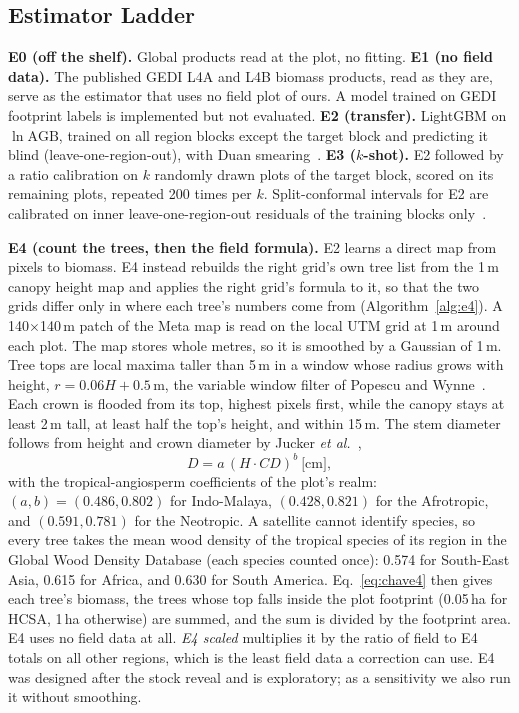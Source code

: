 \documentclass[conference,a4paper]{IEEEtran}
\begin{document}
\subsection{Estimator Ladder}
\textbf{E0 (off the shelf).} Global products read at the plot, no fitting. \textbf{E1 (no field data).} The published GEDI L4A and L4B biomass products, read as they are, serve as the estimator that uses no field plot of ours. A model trained on GEDI footprint labels is implemented but not evaluated. \textbf{E2 (transfer).} LightGBM on $\ln\mathrm{AGB}$, trained on all region blocks except the target block and predicting it blind (leave-one-region-out), with Duan smearing~\cite{duan1983smearing}. \textbf{E3 ($k$-shot).} E2 followed by a ratio calibration on $k$ randomly drawn plots of the target block, scored on its remaining plots, repeated 200 times per $k$. Split-conformal intervals for E2 are calibrated on inner leave-one-region-out residuals of the training blocks only~\cite{vovk2005algorithmic}.

\textbf{E4 (count the trees, then the field formula).} E2 learns a direct map from pixels to biomass. E4 instead rebuilds the right grid's own tree list from the 1\,m canopy height map and applies the right grid's formula to it, so that the two grids differ only in where each tree's numbers come from (Algorithm~\ref{alg:e4}). A 140$\times$140\,m patch of the Meta map is read on the local UTM grid at 1\,m around each plot. The map stores whole metres, so it is smoothed by a Gaussian of 1\,m. Tree tops are local maxima taller than 5\,m in a window whose radius grows with height, $r=0.06H+0.5$\,m, the variable window filter of Popescu and Wynne~\cite{popescu2004seeing}. Each crown is flooded from its top, highest pixels first, while the canopy stays at least 2\,m tall, at least half the top's height, and within 15\,m. The stem diameter follows from height and crown diameter by Jucker \textit{et al.}~\cite{jucker2017allometric},
\begin{equation}
D=a\,(H\cdot CD)^{b}\ \text{[cm]},
\label{eq:jucker}
\end{equation}
with the tropical-angiosperm coefficients of the plot's realm: $(a,b)=(0.486,0.802)$ for Indo-Malaya, $(0.428,0.821)$ for the Afrotropic, and $(0.591,0.781)$ for the Neotropic. A satellite cannot identify species, so every tree takes the mean wood density of the tropical species of its region in the Global Wood Density Database (each species counted once): 0.574 for South-East Asia, 0.615 for Africa, and 0.630 for South America. Eq.~\ref{eq:chave4} then gives each tree's biomass, the trees whose top falls inside the plot footprint (0.05\,ha for HCSA, 1\,ha otherwise) are summed, and the sum is divided by the footprint area. E4 uses no field data at all. \emph{E4 scaled} multiplies it by the ratio of field to E4 totals on all other regions, which is the least field data a correction can use. E4 was designed after the stock reveal and is exploratory; as a sensitivity we also run it without smoothing.
\end{document}
